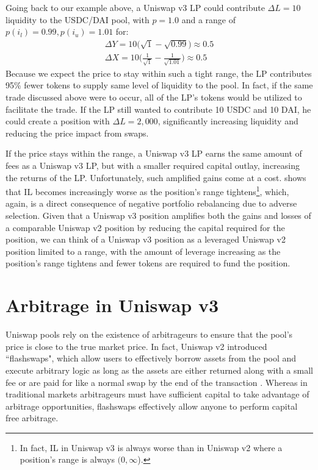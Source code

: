 \documentclass[11pt]{article}
\begin{document}
Going back to our example above, a Uniswap v3 LP could contribute $\Delta L = 10$ liquidity to the USDC/DAI pool, with $p = 1.0$ and a range of $p(i_l) = 0.99, p(i_u) = 1.01$ for:
\begin{gather*}
    \Delta Y = 10 \big( \sqrt{1} - \sqrt{0.99} \big) \approx 0.5 \\
    \Delta X = 10 \bigg( \frac{1}{\sqrt{1}} - \frac{1}{\sqrt{1.01}} \bigg) \approx 0.5
\end{gather*}
Because we expect the price to stay within such a tight range, the LP contributes 95\% fewer tokens to supply same level of liquidity to the pool. In fact, if the same trade discussed above were to occur, all of the LP's tokens would be utilized to facilitate the trade. If the LP still wanted to contribute 10 USDC and 10 DAI, he could create a position with $\Delta L = 2,000$, significantly increasing liquidity and reducing the price impact from swaps.

If the price stays within the range, a Uniswap v3 LP earns the same amount of fees as a Uniswap v3 LP, but with a smaller required capital outlay, increasing the returns of the LP. Unfortunately, such amplified gains come at a cost. \citet{LambertMedium3} shows that IL becomes increasingly worse as the position's range tightens\footnote{In fact, IL in Uniswap v3 is always worse than in Uniswap v2 where a position's range is always $(0, \infty$).}, which, again, is a direct consequence of negative portfolio rebalancing due to adverse selection. Given that a Uniswap v3 position amplifies both the gains and losses of a comparable Uniswap v2 position by reducing the capital required for the position, we can think of a Uniswap v3 position as a leveraged Uniswap v2 position limited to a range, with the amount of leverage increasing as the position's range tightens and fewer tokens are required to fund the position.

\section{Arbitrage in Uniswap v3}\label{sec:3}

Uniswap pools rely on the existence of arbitrageurs to ensure that the pool's price is close to the true market price. In fact, Uniswap v2 introduced ``\glspl{flashswap}", which allow users to effectively borrow assets from the pool and execute arbitrary logic as long as the assets are either returned along with a small fee or are paid for like a normal swap by the end of the transaction \citep{Uniswapv2}. Whereas in traditional markets arbitrageurs must have sufficient capital to take advantage of arbitrage opportunities, \glspl{flashswap} effectively allow anyone to perform capital free arbitrage.
\end{document}
